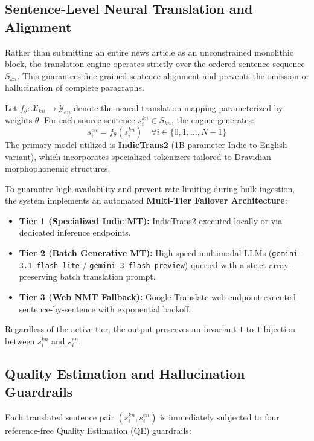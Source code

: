 \documentclass[conference]{IEEEtran}
\begin{document}
\subsection{Sentence-Level Neural Translation and Alignment}
Rather than submitting an entire news article as an unconstrained monolithic block, the translation engine operates strictly over the ordered sentence sequence $S_{kn}$. This guarantees fine-grained sentence alignment and prevents the omission or hallucination of complete paragraphs.

Let $f_{\theta}: \mathcal{X}_{kn} \to \mathcal{Y}_{en}$ denote the neural translation mapping parameterized by weights $\theta$. For each source sentence $s_i^{kn} \in S_{kn}$, the engine generates:
\begin{equation}
    s_i^{en} = f_{\theta}(s_i^{kn}) \quad \forall i \in \{0, 1, \dots, N-1\}
    \label{eq:sentence_translation}
\end{equation}
The primary model utilized is \textbf{IndicTrans2} (1B parameter Indic-to-English variant), which incorporates specialized tokenizers tailored to Dravidian morphophonemic structures. 

To guarantee high availability and prevent rate-limiting during bulk ingestion, the system implements an automated \textbf{Multi-Tier Failover Architecture}:
\begin{itemize}
    \item \textbf{Tier 1 (Specialized Indic MT):} IndicTrans2 executed locally or via dedicated inference endpoints.
    \item \textbf{Tier 2 (Batch Generative MT):} High-speed multimodal LLMs (\texttt{gemini-3.1-flash-lite} / \texttt{gemini-3-flash-preview}) queried with a strict array-preserving batch translation prompt.
    \item \textbf{Tier 3 (Web NMT Fallback):} Google Translate web endpoint executed sentence-by-sentence with exponential backoff.
\end{itemize}
Regardless of the active tier, the output preserves an invariant $1$-to-$1$ bijection between $s_i^{kn}$ and $s_i^{en}$.

\subsection{Quality Estimation and Hallucination Guardrails}
Each translated sentence pair $(s_i^{kn}, s_i^{en})$ is immediately subjected to four reference-free Quality Estimation (QE) guardrails:
\end{document}
